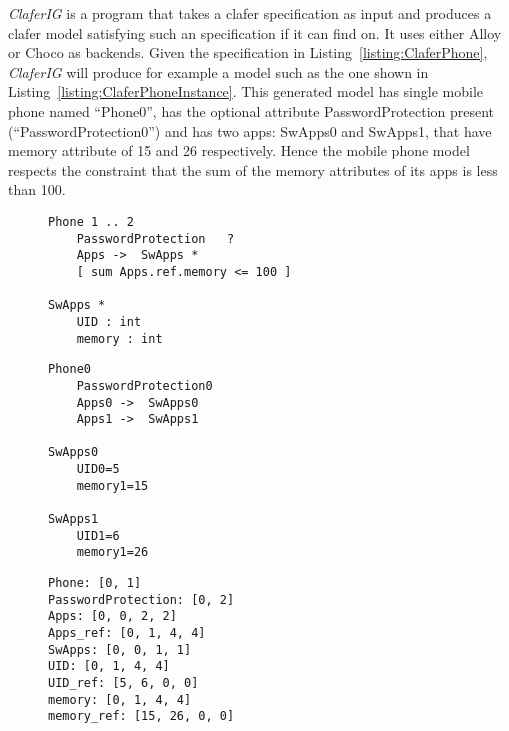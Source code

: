 \documentclass{article}
\newcommand{\listref}[1]{Listing~\ref{#1}}
\begin{document}
\emph{ClaferIG}  is a program that takes a clafer specification as input and produces a clafer model satisfying such an specification if it can find on. It uses either Alloy or Choco as backends. Given the specification in  \listref{listing:ClaferPhone}, \emph{ClaferIG}   will produce for example a model such as the one shown in \listref{listing:ClaferPhoneInstance}.  This generated model has single mobile phone named ``Phone0'', has the optional attribute PasswordProtection present (``PasswordProtection0'') and has two apps: SwApps0 and SwApps1, that have memory attribute of 15 and 26 respectively. Hence the mobile phone model respects the constraint that the sum of the memory attributes of its apps is less than 100. 
\begin{figure}[!t]
\par\noindent
\begin{minipage}[t]{.32\textwidth}
\begin{lstlisting}[language=clafer, caption=A specification of a mobile phone and its apps in clafer., label={listing:ClaferPhone}]
Phone 1 .. 2
	PasswordProtection 	 ?
	Apps ->  SwApps *
	[ sum Apps.ref.memory <= 100 ]
	
SwApps * 
	UID : int
	memory : int
\end{lstlisting}%
\end{minipage}%
\hfill
\begin{minipage}[t]{.32\textwidth}
\begin{lstlisting}[language=clafer, caption=A generated model of a mobile phone and its apps in clafer from the specification in Listing 1., label={listing:ClaferPhoneInstance}]
Phone0
	PasswordProtection0
	Apps0 ->  SwApps0
	Apps1 ->  SwApps1
	
SwApps0 
	UID0=5
	memory1=15

SwApps1 
	UID1=6
	memory1=26
\end{lstlisting}%
\end{minipage}%
\hfill
\begin{minipage}[t]{.32\textwidth}
\begin{lstlisting}[language=clafer, caption=The integer variables associated with each clafer in Z3 and corresponding to Listing 2., label={listing:ClaferPhoneZ3}]
Phone: [0, 1]
PasswordProtection: [0, 2]
Apps: [0, 0, 2, 2]
Apps_ref: [0, 1, 4, 4]
SwApps: [0, 0, 1, 1]
UID: [0, 1, 4, 4]
UID_ref: [5, 6, 0, 0]
memory: [0, 1, 4, 4]
memory_ref: [15, 26, 0, 0]
\end{lstlisting}%
\end{minipage}%
\end{figure}
\end{document}

